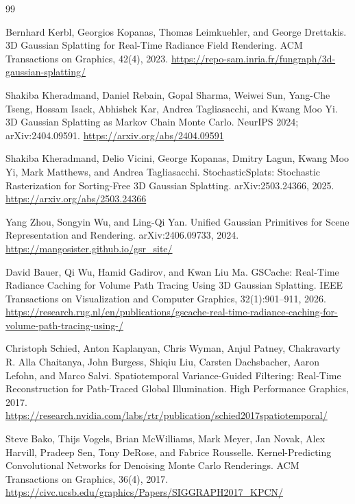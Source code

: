 \documentclass[11pt]{article}
\begin{document}
\begin{thebibliography}{99}

Bernhard Kerbl, Georgios Kopanas, Thomas Leimkuehler, and George Drettakis.
\newblock 3D Gaussian Splatting for Real-Time Radiance Field Rendering.
\newblock ACM Transactions on Graphics, 42(4), 2023.
\newblock \url{https://repo-sam.inria.fr/fungraph/3d-gaussian-splatting/}

Shakiba Kheradmand, Daniel Rebain, Gopal Sharma, Weiwei Sun, Yang-Che Tseng,
Hossam Isack, Abhishek Kar, Andrea Tagliasacchi, and Kwang Moo Yi.
\newblock 3D Gaussian Splatting as Markov Chain Monte Carlo.
\newblock NeurIPS 2024; arXiv:2404.09591.
\newblock \url{https://arxiv.org/abs/2404.09591}

Shakiba Kheradmand, Delio Vicini, George Kopanas, Dmitry Lagun,
Kwang Moo Yi, Mark Matthews, and Andrea Tagliasacchi.
\newblock StochasticSplats: Stochastic Rasterization for Sorting-Free 3D
Gaussian Splatting.
\newblock arXiv:2503.24366, 2025.
\newblock \url{https://arxiv.org/abs/2503.24366}

Yang Zhou, Songyin Wu, and Ling-Qi Yan.
\newblock Unified Gaussian Primitives for Scene Representation and Rendering.
\newblock arXiv:2406.09733, 2024.
\newblock \url{https://mangosister.github.io/gsr_site/}

David Bauer, Qi Wu, Hamid Gadirov, and Kwan Liu Ma.
\newblock GSCache: Real-Time Radiance Caching for Volume Path Tracing Using
3D Gaussian Splatting.
\newblock IEEE Transactions on Visualization and Computer Graphics,
32(1):901--911, 2026.
\newblock \url{https://research.rug.nl/en/publications/gscache-real-time-radiance-caching-for-volume-path-tracing-using-/}

Christoph Schied, Anton Kaplanyan, Chris Wyman, Anjul Patney,
Chakravarty R. Alla Chaitanya, John Burgess, Shiqiu Liu, Carsten Dachsbacher,
Aaron Lefohn, and Marco Salvi.
\newblock Spatiotemporal Variance-Guided Filtering: Real-Time Reconstruction
for Path-Traced Global Illumination.
\newblock High Performance Graphics, 2017.
\newblock \url{https://research.nvidia.com/labs/rtr/publication/schied2017spatiotemporal/}

Steve Bako, Thijs Vogels, Brian McWilliams, Mark Meyer, Jan Novak,
Alex Harvill, Pradeep Sen, Tony DeRose, and Fabrice Rousselle.
\newblock Kernel-Predicting Convolutional Networks for Denoising Monte Carlo
Renderings.
\newblock ACM Transactions on Graphics, 36(4), 2017.
\newblock \url{https://civc.ucsb.edu/graphics/Papers/SIGGRAPH2017_KPCN/}


\end{thebibliography}
\end{document}
